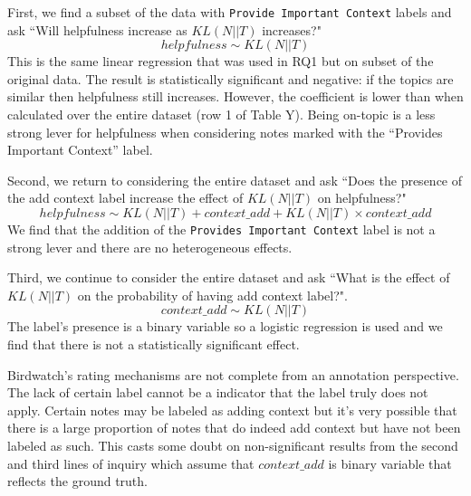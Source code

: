 \documentclass [11pt, proquest] {uwthesis}[2020/02/24]
\begin{document}
First, we find a subset of the data with \verb|Provide Important Context| labels and ask ``Will helpfulness increase as $KL(N || T)$ increases?" $$helpfulness \sim KL(N || T)$$ This is the same linear regression that was used in RQ1 but on subset of the original data. The result is statistically significant and negative: if the topics are similar then helpfulness still increases.  However, the coefficient is lower than when calculated over the entire dataset (row 1 of Table Y). Being on-topic is a less strong lever for helpfulness when considering notes marked with the “Provides Important Context” label.

Second, we return to considering the entire dataset and ask ``Does the presence of the add context label increase the effect of $KL(N || T)$ on helpfulness?" $$helpfulness \sim KL(N || T) + context\_add + KL(N || T) \times context\_add$$ We find that the addition of the \verb|Provides Important Context| label is not a strong lever and there are no heterogeneous effects.

Third, we continue to consider the entire dataset and ask ``What is the effect of $KL(N || T)$ on the probability of having add context label?". $$context\_add \sim KL(N || T)$$ The label's presence is a binary variable so a logistic regression is used and we find that there is not a statistically significant effect.

Birdwatch's rating mechanisms are not complete from an annotation perspective. The lack of certain label cannot be a indicator that the label truly does not apply. Certain notes may be labeled as adding context but it's very possible that there is a large proportion of notes that do indeed add context but have not been labeled as such. This casts some doubt on non-significant results from the second and third lines of inquiry which assume that $context\_add$ is binary variable that reflects the ground truth.



\end{document}
